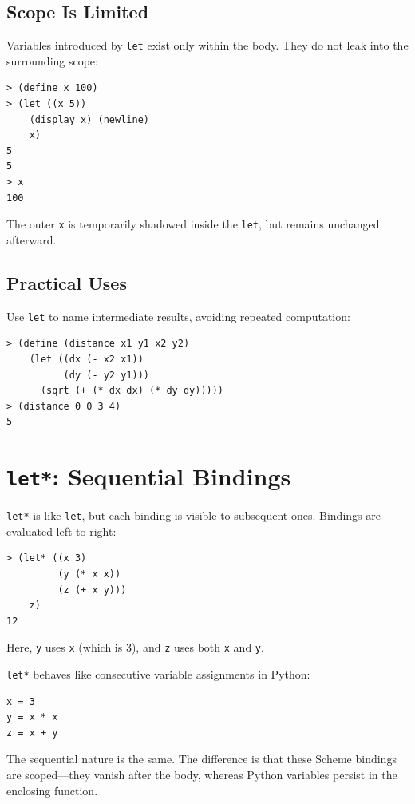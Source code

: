 \subsection{Scope Is Limited}

Variables introduced by \texttt{let} exist only within the body. They do not leak into the surrounding scope:

\begin{lstlisting}[style=repl]
> (define x 100)
> (let ((x 5))
    (display x) (newline)
    x)
5
5
> x
100
\end{lstlisting}

The outer \texttt{x} is temporarily shadowed inside the \texttt{let}, but remains unchanged afterward.

\subsection{Practical Uses}

Use \texttt{let} to name intermediate results, avoiding repeated computation:

\begin{lstlisting}[style=repl]
> (define (distance x1 y1 x2 y2)
    (let ((dx (- x2 x1))
          (dy (- y2 y1)))
      (sqrt (+ (* dx dx) (* dy dy)))))
> (distance 0 0 3 4)
5
\end{lstlisting}

\section{\texttt{let*}: Sequential Bindings}

\texttt{let*} is like \texttt{let}, but each binding is visible to subsequent ones. Bindings are evaluated left to right:

\begin{lstlisting}[style=repl]
> (let* ((x 3)
         (y (* x x))
         (z (+ x y)))
    z)
12
\end{lstlisting}

Here, \texttt{y} uses \texttt{x} (which is 3), and \texttt{z} uses both \texttt{x} and \texttt{y}.

\begin{note}
\texttt{let*} behaves like consecutive variable assignments in Python:
\begin{Verbatim}[fontsize=\small]
x = 3
y = x * x
z = x + y
\end{Verbatim}
The sequential nature is the same. The difference is that these Scheme bindings are scoped---they vanish after the body, whereas Python variables persist in the enclosing function.
\end{note}

